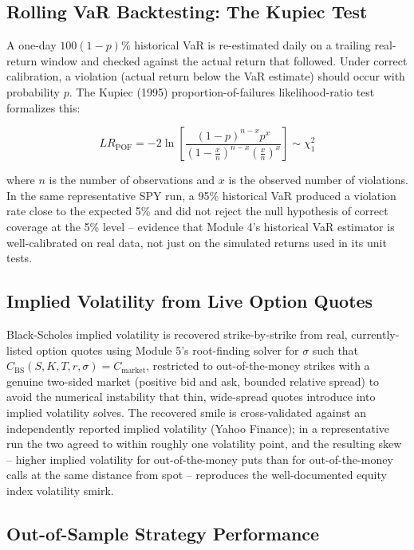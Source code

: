 \documentclass[12pt,a4paper]{article}
\begin{document}
\subsection{Rolling VaR Backtesting: The Kupiec Test}

A one-day $100(1-p)\%$ historical VaR is re-estimated daily on a trailing real-return window
and checked against the actual return that followed. Under correct calibration, a violation
(actual return below the VaR estimate) should occur with probability $p$. The Kupiec (1995)
proportion-of-failures likelihood-ratio test formalizes this:

\begin{equation}
LR_{\text{POF}} = -2 \ln \left[ \frac{(1-p)^{n-x} p^{x}}{\left(1-\frac{x}{n}\right)^{n-x} \left(\frac{x}{n}\right)^{x}} \right] \sim \chi^2_1
\end{equation}

where $n$ is the number of observations and $x$ is the observed number of violations. In the
same representative SPY run, a 95\% historical VaR produced a violation rate close to the
expected 5\% and did not reject the null hypothesis of correct coverage at the 5\% level --
evidence that Module 4's historical VaR estimator is well-calibrated on real data, not just
on the simulated returns used in its unit tests.

\subsection{Implied Volatility from Live Option Quotes}

Black-Scholes implied volatility is recovered strike-by-strike from real, currently-listed
option quotes using Module 5's root-finding solver for $\sigma$ such that
$C_{\text{BS}}(S, K, T, r, \sigma) = C_{\text{market}}$, restricted to out-of-the-money
strikes with a genuine two-sided market (positive bid and ask, bounded relative spread) to
avoid the numerical instability that thin, wide-spread quotes introduce into implied
volatility solves. The recovered smile is cross-validated against an independently reported
implied volatility (Yahoo Finance); in a representative run the two agreed to within roughly
one volatility point, and the resulting skew -- higher implied volatility for
out-of-the-money puts than for out-of-the-money calls at the same distance from spot --
reproduces the well-documented equity index volatility smirk.

\subsection{Out-of-Sample Strategy Performance}
\end{document}
